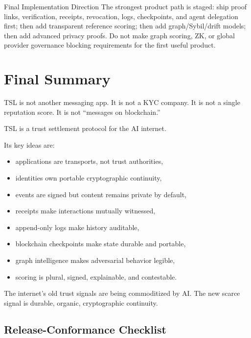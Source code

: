 \documentclass[11pt]{article}
\newcommand{\TSL}{\textsc{TSL}}
\begin{document}
\begin{principlebox}{Final Implementation Direction}
The strongest product path is staged: ship proof links, verification, receipts, revocation, logs, checkpoints, and agent delegation first; then add transparent reference scoring; then add graph/Sybil/drift models; then add advanced privacy proofs. Do not make graph scoring, ZK, or global provider governance blocking requirements for the first useful product.
\end{principlebox}


\section{Final Summary}

\TSL{} is not another messaging app. It is not a KYC company. It is not a single reputation score. It is not ``messages on blockchain.''

\TSL{} is a trust settlement protocol for the AI internet.

Its key ideas are:

\begin{itemize}
    \item applications are transports, not trust authorities,
    \item identities own portable cryptographic continuity,
    \item events are signed but content remains private by default,
    \item receipts make interactions mutually witnessed,
    \item append-only logs make history auditable,
    \item blockchain checkpoints make state durable and portable,
    \item graph intelligence makes adversarial behavior legible,
    \item scoring is plural, signed, explainable, and contestable.
\end{itemize}

The internet's old trust signals are being commoditized by AI. The new scarce signal is durable, organic, cryptographic continuity.



\subsection{Release-Conformance Checklist}
\end{document}
